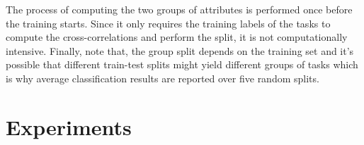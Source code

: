 \documentclass[10pt,twocolumn,letterpaper]{article}
\begin{document}
	The process of computing the two groups of attributes is performed once before the training starts. Since it only requires the training labels of the tasks to compute the cross-correlations and perform the split, it is not computationally intensive. Finally, note that, the group split depends on the training set and it's possible that different train-test splits might yield different groups of tasks which is why average classification results are reported over five random splits. 
	
	
	\section{Experiments}    
	
\end{document}
